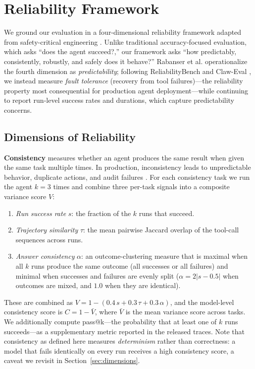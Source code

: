 
\section{Reliability Framework}
\label{sec:framework}

We ground our evaluation in a four-dimensional reliability framework adapted from safety-critical engineering \cite{rabanser2026science, leveson2011engineering}. Unlike traditional accuracy-focused evaluation, which asks ``does the agent succeed?,'' our framework asks ``how predictably, consistently, robustly, and safely does it behave?'' Rabanser et al. \cite{rabanser2026science} operationalize the fourth dimension as \emph{predictability}; following ReliabilityBench \cite{gupta2026reliabilitybench} and Claw-Eval \cite{claw2026eval}, we instead measure \emph{fault tolerance} (recovery from tool failures)---the reliability property most consequential for production agent deployment---while continuing to report run-level success rates and durations, which capture predictability concerns.

\subsection{Dimensions of Reliability}

\textbf{Consistency} measures whether an agent produces the same result when given the same task multiple times. In production, inconsistency leads to unpredictable behavior, duplicate actions, and audit failures \cite{yagubyan2026consistency}. For each consistency task we run the agent $k = 3$ times and combine three per-task signals into a composite variance score $V$:
\begin{enumerate}[nosep]
    \item \emph{Run success rate} $s$: the fraction of the $k$ runs that succeed.
    \item \emph{Trajectory similarity} $\tau$: the mean pairwise Jaccard overlap of the tool-call sequences across runs.
    \item \emph{Answer consistency} $\alpha$: an outcome-clustering measure that is maximal when all $k$ runs produce the same outcome (all successes or all failures) and minimal when successes and failures are evenly split ($\alpha = 2|s - 0.5|$ when outcomes are mixed, and $1.0$ when they are identical).
\end{enumerate}
These are combined as $V = 1 - (0.4\,s + 0.3\,\tau + 0.3\,\alpha)$, and the model-level consistency score is $C = 1 - \bar{V}$, where $\bar{V}$ is the mean variance score across tasks. We additionally compute pass@k---the probability that at least one of $k$ runs succeeds---as a supplementary metric reported in the released traces. Note that consistency as defined here measures \emph{determinism} rather than correctness: a model that fails identically on every run receives a high consistency score, a caveat we revisit in Section~\ref{sec:dimensions}.

